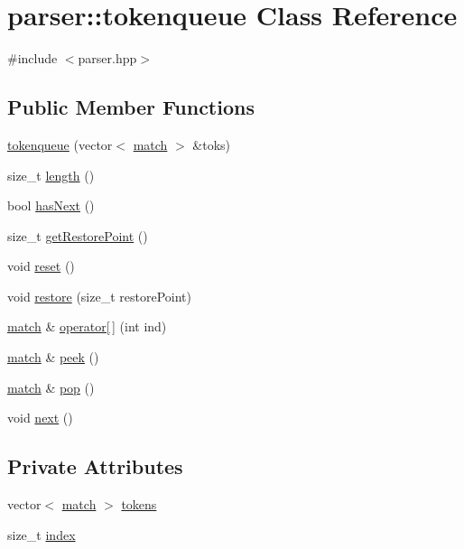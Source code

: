 \hypertarget{classparser_1_1tokenqueue}{}\section{parser\+:\+:tokenqueue Class Reference}
\label{classparser_1_1tokenqueue}


{\ttfamily \#include $<$parser.\+hpp$>$}

\subsection*{Public Member Functions}
\begin{DoxyCompactItemize}
\item 
\hyperlink{classparser_1_1tokenqueue_a8727f483d2c016495487b7fe1aa9d2be}{tokenqueue} (vector$<$ \hyperlink{structlexical_1_1match}{match} $>$ \&toks)
\item 
size\+\_\+t \hyperlink{classparser_1_1tokenqueue_a19ed9dd34d5c205531e963241bbb4db5}{length} ()
\item 
bool \hyperlink{classparser_1_1tokenqueue_a177e88ad8ccef06bb18777fe59fff7bd}{has\+Next} ()
\item 
size\+\_\+t \hyperlink{classparser_1_1tokenqueue_a69326556cef2a89af0eb7310d2eb19d3}{get\+Restore\+Point} ()
\item 
void \hyperlink{classparser_1_1tokenqueue_a9e57fac92d33fe369a7ad6b87d63e7d5}{reset} ()
\item 
void \hyperlink{classparser_1_1tokenqueue_a39e90ab211fa63af79852763312f3242}{restore} (size\+\_\+t restore\+Point)
\item 
\hyperlink{structlexical_1_1match}{match} \& \hyperlink{classparser_1_1tokenqueue_a981f451b1248537433bdb5aaa0ca6368}{operator\mbox{[}$\,$\mbox{]}} (int ind)
\item 
\hyperlink{structlexical_1_1match}{match} \& \hyperlink{classparser_1_1tokenqueue_afa7d5f0dcdce020660def60538c9f7eb}{peek} ()
\item 
\hyperlink{structlexical_1_1match}{match} \& \hyperlink{classparser_1_1tokenqueue_aa8c2fdc681835f88dfe43659d18b0922}{pop} ()
\item 
void \hyperlink{classparser_1_1tokenqueue_a75841d5aaa1b6eb3686481f61de07bbf}{next} ()
\end{DoxyCompactItemize}
\subsection*{Private Attributes}
\begin{DoxyCompactItemize}
\item 
vector$<$ \hyperlink{structlexical_1_1match}{match} $>$ \hyperlink{classparser_1_1tokenqueue_af9c381cb6495ade00167f2242b6862c5}{tokens}
\item 
size\+\_\+t \hyperlink{classparser_1_1tokenqueue_a442939c8efd904678d30e863da8db52b}{index}
\end{DoxyCompactItemize}


